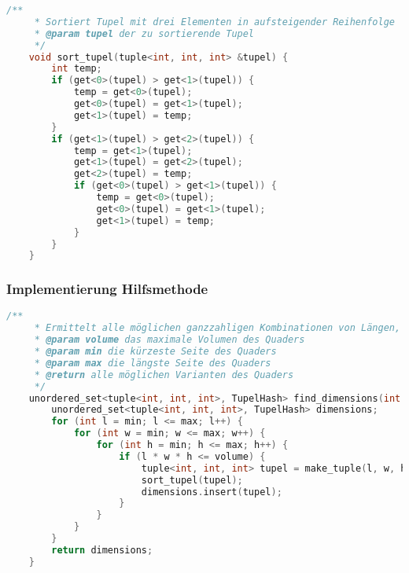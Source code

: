 \documentclass[a4paper,10pt,ngerman]{scrartcl}
\begin{document}
    \begin{lstlisting}[frame=single,language=C++,title=Methode sort\_tupel,breaklines=true,label={lst:code_sortTupel}]
    /**
     * Sortiert Tupel mit drei Elementen in aufsteigender Reihenfolge
     * @param tupel der zu sortierende Tupel
     */
    void sort_tupel(tuple<int, int, int> &tupel) {
        int temp;
        if (get<0>(tupel) > get<1>(tupel)) {
            temp = get<0>(tupel);
            get<0>(tupel) = get<1>(tupel);
            get<1>(tupel) = temp;
        }
        if (get<1>(tupel) > get<2>(tupel)) {
            temp = get<1>(tupel);
            get<1>(tupel) = get<2>(tupel);
            get<2>(tupel) = temp;
            if (get<0>(tupel) > get<1>(tupel)) {
                temp = get<0>(tupel);
                get<0>(tupel) = get<1>(tupel);
                get<1>(tupel) = temp;
            }
        }
    }
    \end{lstlisting}

    \newpage

    \subsubsection{Implementierung Hilfsmethode}
    \begin{lstlisting}[frame=single,language=C++,title=Methode find\_dimensions,breaklines=true,label={lst:code_findDimensions}]
    /**
     * Ermittelt alle möglichen ganzzahligen Kombinationen von Längen, Breiten und Höhen für einen Quader
     * @param volume das maximale Volumen des Quaders
     * @param min die kürzeste Seite des Quaders
     * @param max die längste Seite des Quaders
     * @return alle möglichen Varianten des Quaders
     */
    unordered_set<tuple<int, int, int>, TupelHash> find_dimensions(int volume, const int &min, const int &max) {
        unordered_set<tuple<int, int, int>, TupelHash> dimensions;
        for (int l = min; l <= max; l++) {
            for (int w = min; w <= max; w++) {
                for (int h = min; h <= max; h++) {
                    if (l * w * h <= volume) {
                        tuple<int, int, int> tupel = make_tuple(l, w, h);
                        sort_tupel(tupel);
                        dimensions.insert(tupel);
                    }
                }
            }
        }
        return dimensions;
    }
    \end{lstlisting}
\end{document}

